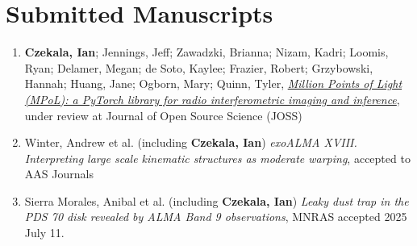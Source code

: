 \section*{Submitted Manuscripts}
\begin{enumerate}
\item \textbf{Czekala, Ian}; Jennings, Jeff; Zawadzki, Brianna; Nizam, Kadri; Loomis, Ryan; Delamer, Megan; de Soto, Kaylee; Frazier, Robert; Grzybowski, Hannah; Huang, Jane; Ogborn, Mary; Quinn, Tyler, \href{https://ui.adsabs.harvard.edu/abs/2025arXiv250200100C/abstract}{\emph{Million Points of Light (MPoL): a PyTorch library for radio interferometric imaging and inference}}, under review at Journal of Open Source Science (JOSS)
\item Winter, Andrew et al. (including \textbf{Czekala, Ian}) \emph{exoALMA XVIII. Interpreting large scale kinematic structures as moderate warping}, accepted to AAS Journals
\item Sierra Morales, Anibal et al. (including \textbf{Czekala, Ian}) \emph{Leaky dust trap in the PDS 70 disk revealed by ALMA Band 9 observations}, MNRAS accepted 2025 July 11.
\end{enumerate}